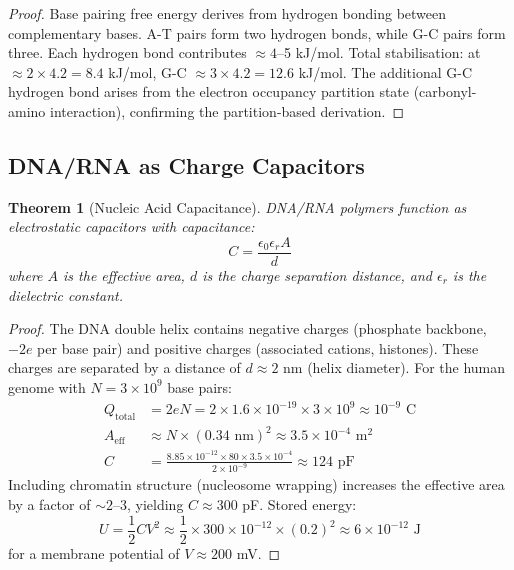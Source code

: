 \documentclass[11pt,a4paper]{article}
\newtheorem{theorem}{Theorem}[section]
\theoremstyle{remark}
\begin{document}
\begin{proof}
Base pairing free energy derives from hydrogen bonding between complementary bases. A-T pairs form two hydrogen bonds, while G-C pairs form three. Each hydrogen bond contributes $\approx 4$--5 kJ/mol. Total stabilisation: at $\approx 2 \times 4.2 = 8.4$ kJ/mol, G-C $\approx 3 \times 4.2 = 12.6$ kJ/mol. The additional G-C hydrogen bond arises from the electron occupancy partition state (carbonyl-amino interaction), confirming the partition-based derivation.
\end{proof}

\subsection{DNA/RNA as Charge Capacitors}

\begin{theorem}[Nucleic Acid Capacitance]
\label{thm:nucleic_capacitance}
DNA/RNA polymers function as electrostatic capacitors with capacitance:
\begin{equation}
C = \frac{\epsilon_0 \epsilon_r A}{d}
\end{equation}
where $A$ is the effective area, $d$ is the charge separation distance, and $\epsilon_r$ is the dielectric constant.
\end{theorem}

\begin{proof}
The DNA double helix contains negative charges (phosphate backbone, $-2e$ per base pair) and positive charges (associated cations, histones). These charges are separated by a distance of $d \approx 2$ nm (helix diameter). For the human genome with $N = 3 \times 10^9$ base pairs:
\begin{align}
Q_{\text{total}} &= 2eN = 2 \times 1.6 \times 10^{-19} \times 3 \times 10^9 \approx 10^{-9} \text{ C} \\
A_{\text{eff}} &\approx N \times (0.34 \text{ nm})^2 \approx 3.5 \times 10^{-4} \text{ m}^2 \\
C &= \frac{8.85 \times 10^{-12} \times 80 \times 3.5 \times 10^{-4}}{2 \times 10^{-9}} \approx 124 \text{ pF}
\end{align}
Including chromatin structure (nucleosome wrapping) increases the effective area by a factor of $\sim 2$--3, yielding $C \approx 300$ pF. Stored energy:
\begin{equation}
U = \frac{1}{2}CV^2 \approx \frac{1}{2} \times 300 \times 10^{-12} \times (0.2)^2 \approx 6 \times 10^{-12} \text{ J}
\end{equation}
for a membrane potential of $V \approx 200$ mV.
\end{proof}
\end{document}
